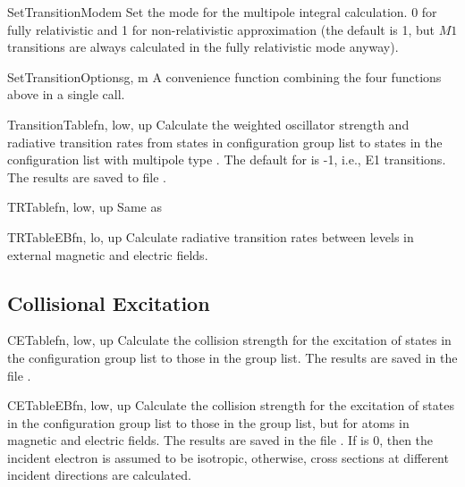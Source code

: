 \begin{fundesc}{SetTransitionMode}{m}
Set the mode for the multipole integral calculation. 0 for fully relativistic
and 1 for non-relativistic approximation (the default is 1, but $M1$ transitions
are always calculated in the fully relativistic mode anyway).
\end{fundesc}

\begin{fundesc}{SetTransitionOptions}{g, m}
A convenience function combining the four functions above in a single call.
\end{fundesc}

\begin{fundesc}{TransitionTable}{fn, low, up}
Calculate the weighted oscillator strength and radiative transition rates from
states in configuration group list  to states in the configuration list
 with multipole type . The default for  is -1, i.e., E1
transitions. The results are saved to file .
\end{fundesc}

\begin{fundesc}{TRTable}{fn, low, up}
Same as 
\end{fundesc}

\begin{fundesc}{TRTableEB}{fn, lo, up}
Calculate radiative transition rates between levels in external magnetic and
electric fields.
\end{fundesc}


\subsection{Collisional Excitation}

\begin{fundesc}{CETable}{fn, low, up}
Calculate the collision strength for the excitation of states in the
configuration group list  to those in the group list. The
results are saved in the file .
\end{fundesc}

\begin{fundesc}{CETableEB}{fn, low, up}
Calculate the collision strength for the excitation of states in the
configuration group list  to those in the group list, but for
atoms in magnetic and electric fields. The
results are saved in the file . If  is 0, then the incident
electron is assumed to be isotropic, otherwise, cross sections at different
incident directions are calculated.
\end{fundesc}

